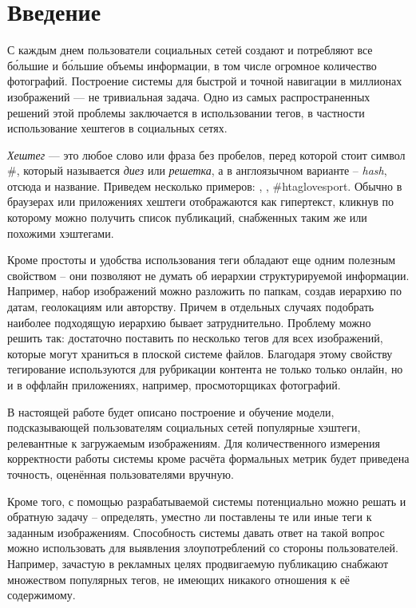 \section*{Введение}

\indent
\indent
С каждым днем пользователи социальных сетей создают и потребляют все б\'{о}льшие
и б\'{о}льшие объемы информации, в том числе огромное количество фотографий.
Построение системы для быстрой и точной навигации в миллионах изображений
 --- не тривиальная задача. Одно из самых распространенных решений этой
 проблемы заключается в использовании тегов, в частности
 использование хештегов в социальных сетях.


\indent
\textit{Хештег} --- это любое слово или фраза без пробелов, перед которой стоит 
символ \#, который называется \textit{диез} или \textit{решетка}, а в англоязычном 
варианте -- \textit{hash}, отсюда и название. Приведем несколько примеров:
, , \#htag{lovesport}. Обычно в браузерах или 
приложениях хештеги отображаются как гипертекст, кликнув по которому можно 
получить список публикаций, снабженных таким же или похожими хэштегами.


\indent
Кроме простоты и удобства использования теги обладают еще одним полезным свойством 
-- они позволяют не думать об  иерархии структурируемой информации. 
Например, набор изображений можно разложить
по папкам, создав иерархию по датам, геолокациям или авторству. Причем в отдельных
случаях подобрать наиболее подходящую иерархию бывает затруднительно. Проблему
можно решить так: достаточно поставить по несколько тегов для всех изображений,
которые могут храниться в плоской системе файлов.
Благодаря этому свойству тегирование используются  для рубрикации контента 
не только только онлайн, но и в оффлайн приложениях, например, 
просмоторщиках фотографий. 


\indent 
В настоящей работе будет описано построение и обучение модели, подсказывающей 
пользователям социальных сетей популярные хэштеги, релевантные к загружаемым
изображениям. Для количественного измерения корректности работы системы 
кроме расчёта формальных метрик будет приведена точность,
оценённая пользователями вручную.


\indent
Кроме того, с помощью разрабатываемой системы потенциально можно решать и 
обратную задачу -- определять,
уместно ли поставлены те или иные теги к заданным изображениям. 
Способность системы давать ответ на такой вопрос можно использовать для 
выявления злоупотреблений со стороны пользователей. Например, зачастую
 в рекламных целях продвигаемую публикацию снабжают множеством популярных 
тегов, не имеющих никакого отношения к её содержимому.
 
 